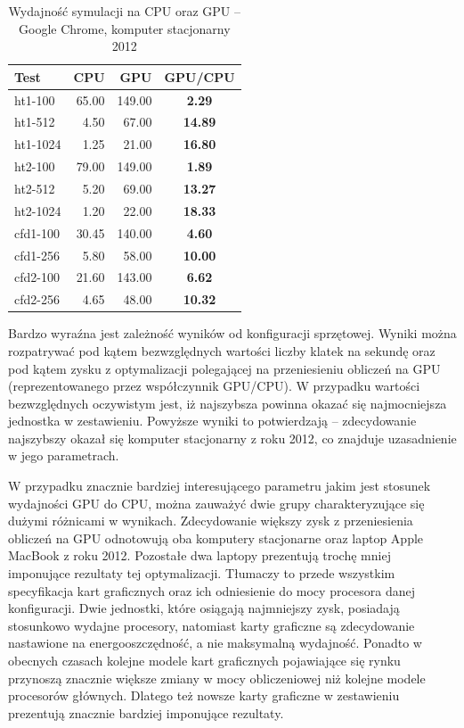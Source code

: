 \clearpage

\begin{table}[!htp]
\caption{Wydajność symulacji na CPU oraz GPU -- Google Chrome, komputer stacjonarny 2012}
\centering
\begin{tabular}{|l|r|r|>{\bfseries}c|}
\hline
\cellcolor{t} Test & \cellcolor{cpu} CPU & \cellcolor{gpu} GPU & \cellcolor{gc} GPU/CPU \\ \hline
ht1-100 & 65.00 & 149.00 & 2.29 \\ \hline
ht1-512 & 4.50 & 67.00 & 14.89 \\ \hline
ht1-1024 & 1.25 & 21.00 & 16.80 \\ \hline
ht2-100 & 79.00 & 149.00 & 1.89 \\ \hline
ht2-512 & 5.20 & 69.00 & 13.27 \\ \hline
ht2-1024 & 1.20 & 22.00 & 18.33 \\ \hline
\hline
cfd1-100 & 30.45 & 140.00 & 4.60 \\ \hline
cfd1-256 & 5.80 & 58.00 & 10.00 \\ \hline
cfd2-100 & 21.60 & 143.00 & 6.62 \\ \hline
cfd2-256 & 4.65 & 48.00 & 10.32 \\ \hline
\end{tabular}
\label{tab:wynikiWebGL_last}
\end{table}

Bardzo wyraźna jest zależność wyników od konfiguracji sprzętowej. Wyniki można
rozpatrywać pod kątem bezwzględnych wartości liczby klatek na sekundę oraz pod
kątem zysku z optymalizacji polegającej na przeniesieniu obliczeń na GPU
(reprezentowanego przez współczynnik GPU/CPU). W przypadku wartości
bezwzględnych oczywistym jest, iż najszybsza powinna okazać się najmocniejsza
jednostka w zestawieniu. Powyższe wyniki to potwierdzają -- zdecydowanie
najszybszy okazał się komputer stacjonarny z roku 2012, co znajduje
uzasadnienie w jego parametrach.

W przypadku znacznie bardziej interesującego parametru jakim jest stosunek
wydajności GPU do CPU, można zauważyć dwie grupy charakteryzujące się dużymi
różnicami w wynikach. Zdecydowanie większy zysk z przeniesienia obliczeń na
GPU odnotowują oba komputery stacjonarne oraz laptop Apple MacBook z roku
2012. Pozostałe dwa laptopy prezentują trochę mniej imponujące rezultaty tej
optymalizacji. Tłumaczy to przede wszystkim specyfikacja kart graficznych oraz
ich odniesienie do mocy procesora danej konfiguracji. Dwie jednostki, które
osiągają najmniejszy zysk, posiadają stosunkowo wydajne procesory, natomiast
karty graficzne są zdecydowanie nastawione na energooszczędność, a nie
maksymalną wydajność. Ponadto w obecnych czasach kolejne modele kart
graficznych pojawiające się rynku przynoszą znacznie większe zmiany w mocy
obliczeniowej niż kolejne modele procesorów głównych. Dlatego też nowsze
karty graficzne w zestawieniu prezentują znacznie bardziej imponujące
rezultaty.

